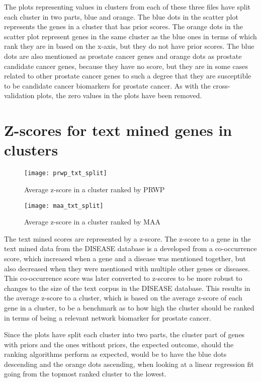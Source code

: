 The plots representing values in clusters from each of these three files have
split each cluster in two parts, blue and orange. The blue dots in the scatter
plot represents the genes in a cluster that has prior scores. The orange dots in
the scatter plot represent genes in the same cluster as the blue ones in terms
of which rank they are in based on the x-axis, but they do not have prior
scores. The blue dots are also mentioned as prostate cancer genes and orange
dots as prostate candidate cancer genes, because they have no score, but they
are in some cases related to other prostate cancer genes to such a degree that
they are susceptible to be candidate cancer biomarkers for prostate cancer. As
with the cross-validation plots, the zero values in the plots have been removed.

\section{Z-scores for text mined genes in clusters}
\begin{sidewaysfigure}
    \texttt{[image: prwp\_txt\_split]}
    \caption{Average z-score in a cluster ranked by PRWP}
    \label{fig:txt-iref-prwp}
\end{sidewaysfigure}
\begin{sidewaysfigure}
    \texttt{[image: maa\_txt\_split]}
    \caption{Average z-score in a cluster ranked by MAA}
    \label{fig:txt-iref-maa}
\end{sidewaysfigure}

The text mined scores are represented by a z-score. The z-score to a gene in the
text mined data from the DISEASE database is a developed from a co-occurrence
score, which increased when a gene and a disease was mentioned together, but
also decreased when they were mentioned with multiple other genes or diseases.
This co-occurrence score was later converted to z-scores to be more robust to
changes to the size of the text corpus in the DISEASE database\cite{jensen}.
This results in the average z-score to a cluster, which is based on the average
z-score of each gene in a cluster, to be a benchmark as to how high the cluster
should be ranked in terms of being a relevant network biomarker for prostate
cancer.

Since the plots have split each cluster into two parts, the cluster part of
genes with priors and the ones without priors, the expected outcome, should the
ranking algorithms perform as expected, would be to have the blue dots
descending and the orange dots ascending, when looking at a linear regression
fit going from the topmost ranked cluster to the lowest.

